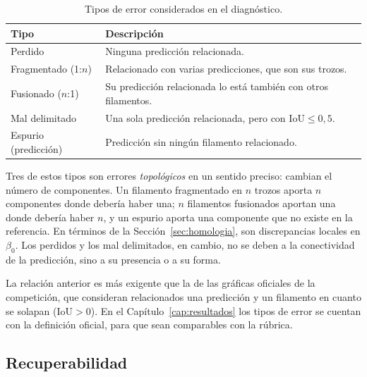 \begin{table}[ht]
\centering
\small
\begin{tabular}{@{}lp{9cm}@{}}
\toprule
Tipo & Descripción\\
\midrule
Perdido & Ninguna predicción relacionada.\\
Fragmentado (1:$n$) & Relacionado con varias predicciones, que son sus trozos.\\
Fusionado ($n$:1) & Su predicción relacionada lo está también con otros filamentos.\\
Mal delimitado & Una sola predicción relacionada, pero con $\mathrm{IoU}\le0{,}5$.\\
Espurio (predicción) & Predicción sin ningún filamento relacionado.\\
\bottomrule
\end{tabular}
\caption{Tipos de error considerados en el diagnóstico.}
\label{tab:taxonomia}
\end{table}

Tres de estos tipos son errores \emph{topológicos} en un sentido preciso:
cambian el número de componentes. Un filamento fragmentado en $n$ trozos
aporta $n$ componentes donde debería haber una; $n$ filamentos fusionados
aportan una donde debería haber $n$, y un espurio aporta una componente
que no existe en la referencia. En términos de la
Sección~\ref{sec:homologia}, son discrepancias locales en $\beta_0$. Los
perdidos y los mal delimitados, en cambio, no se deben a la conectividad
de la predicción, sino a su presencia o a su forma.

La relación anterior es más exigente que la de las gráficas oficiales de
la competición, que consideran relacionados una predicción y un filamento
en cuanto se solapan ($\mathrm{IoU}>0$). En el
Capítulo~\ref{cap:resultados} los tipos de error se cuentan con la
definición oficial, para que sean comparables con la rúbrica.

\subsection{Recuperabilidad}

